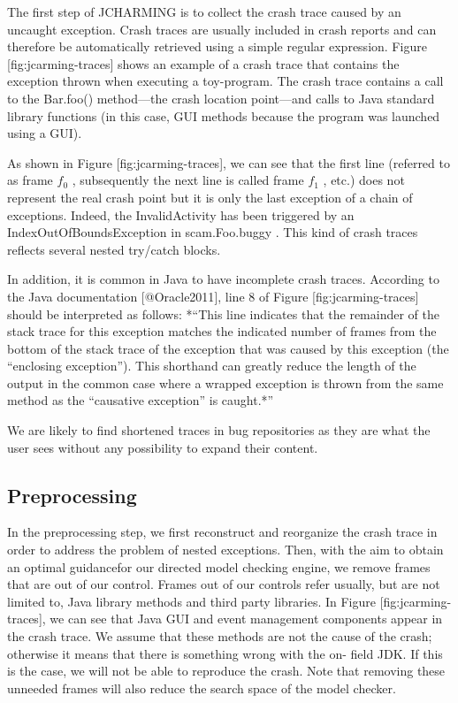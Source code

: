 The first step of JCHARMING is to collect the crash trace caused by an
uncaught exception. Crash traces are usually included in crash reports
and can therefore be automatically retrieved using a simple regular
expression. Figure {[}fig:jcarming-traces{]} shows an example of a crash
trace that contains the exception thrown when executing a toy-program.
The crash trace contains a call to the Bar.foo() method---the crash
location point---and calls to Java standard library functions (in this
case, GUI methods because the program was launched using a GUI).

As shown in Figure {[}fig:jcarming-traces{]}, we can see that the first
line (referred to as frame {\emph{\(f_0\)}} , subsequently the next line
is called frame {\emph{\(f_1\)}} , etc.) does not represent the real
crash point but it is only the last exception of a chain of exceptions.
Indeed, the {InvalidActivity} has been triggered by an
{IndexOutOfBoundsException} in {scam.Foo.buggy} . This kind of crash
traces reflects several nested try/catch blocks.

In addition, it is common in Java to have incomplete crash traces.
According to the Java documentation {[}@Oracle2011{]}, line 8 of Figure
{[}fig:jcarming-traces{]} should be interpreted as follows: *``This line
indicates that the remainder of the stack trace for this exception
matches the indicated number of frames from the bottom of the stack
trace of the exception that was caused by this exception (the
``enclosing exception''). This shorthand can greatly reduce the length
of the output in the common case where a wrapped exception is thrown
from the same method as the ``causative exception'' is caught.*''

We are likely to find shortened traces in bug repositories as they are
what the user sees without any possibility to expand their content.

\subsection{Preprocessing}\label{preprocessing}

In the preprocessing step, we first reconstruct and reorganize the crash
trace in order to address the problem of nested exceptions. Then, with
the aim to obtain an optimal guidancefor our directed model checking
engine, we remove frames that are out of our control. Frames out of our
controls refer usually, but are not limited to, Java library methods and
third party libraries. In Figure {[}fig:jcarming-traces{]}, we can see
that Java GUI and event management components appear in the crash trace.
We assume that these methods are not the cause of the crash; otherwise
it means that there is something wrong with the on- field JDK. If this
is the case, we will not be able to reproduce the crash. Note that
removing these unneeded frames will also reduce the search space of the
model checker.

